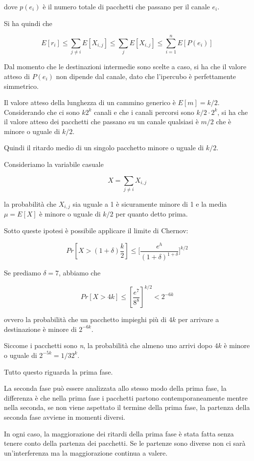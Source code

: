 dove $p(e_i)$ è il numero totale di pacchetti che passano per il canale $e_i$.

Si ha quindi che

$$
E[r_i] \leq \sum\limits_{j \neq i} E[X_{i,j}] \leq \sum\limits_{j} E[X_{i,j}] \leq \sum\limits_{i = 1}^{n} E[P(e_i)]
$$

Dal momento che le destinazioni intermedie sono scelte a caso, si ha che il valore atteso di $P(e_i)$ non dipende dal canale, dato che l'ipercubo è perfettamente simmetrico.

Il valore atteso della lunghezza di un cammino generico è $E[m] = k/2$. Considerando che ci sono $k 2^k$ canali e che i canali percorsi sono $k/2 \cdot  2^{k}$, si ha che il valore atteso dei pacchetti che passano su un canale qualsiasi è $m/2$ che è minore o uguale di $k/2$.

Quindi il ritardo medio di un singolo pacchetto minore o uguale di $k/2$.

Consideriamo la variabile casuale

$$
X = \sum\limits_{j \neq i} X_{i,j}
$$

la probabilità che $X_{i,j}$ sia uguale a 1 è sicuramente minore di 1 e la media $\mu =E[X]$ è minore o uguale di $k/2$ per quanto detto prima.

Sotto queste ipotesi è possibile applicare il limite di Chernov:

$$
Pr[X > (1 + \delta)\frac{k}{2}] \leq \Big[ \frac{e^h}{(1+\delta)^{1+\delta}} \big]^{k/2}
$$

Se prediamo $\delta = 7$, abbiamo che

$$
Pr[X > 4k] \leq  [\frac{e^7}{8^8}]^{k/2} < 2^{-6k}
$$

ovvero la probabilità che un pacchetto impieghi più di $4k$ per arrivare a destinazione è minore di $2^{-6k}$.

Siccome i pacchetti sono \emph{n}, la probabilità che almeno uno arrivi dopo $4k$ è minore o uguale di $2^{-5k} = 1/32^k$.

Tutto questo riguarda la prima fase.

La seconda fase può essere analizzata allo stesso modo della prima fase, la differenza è che nella prima fase i pacchetti partono contemporaneamente mentre nella seconda, se non viene aspettato il termine della prima fase, la partenza della seconda fase avviene in momenti diversi.

In ogni caso, la maggiorazione dei ritardi della prima fase è stata fatta senza tenere conto della partenza dei pacchetti. 
Se le partenze sono diverse non ci sarà un'interferenza ma la maggiorazione continua a valere.

